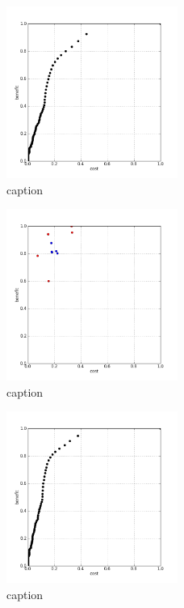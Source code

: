 %
\begin{figure}[!ht]
	\centering
	\includegraphics[width=0.5\textwidth]{img/p1figs/computeFrameStateMagnitudeOnly_sectionCompareBetter_smooth0_tol12_AUC.png}
	\caption{caption}
\end{figure}
%
\begin{figure}[!ht]
	\centering
	\includegraphics[width=0.5\textwidth]{img/p1figs/computeFrameStateMagnitudeOnly_sectionCompareBetter_smooth0_tol24.png}
	\caption{caption}
\end{figure}
%
\begin{figure}[!ht]
	\centering
	\includegraphics[width=0.5\textwidth]{img/p1figs/computeFrameStateMagnitudeOnly_sectionCompareBetter_smooth0_tol24_AUC.png}
	\caption{caption}
\end{figure}
